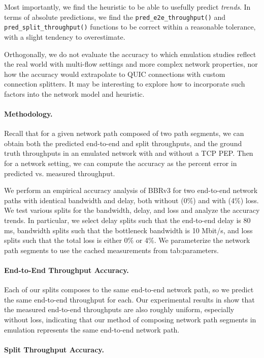 \noindent Most importantly, we find the heuristic to be able to usefully
 predict \textit{trends}.
 In terms of absolute predictions, we find the \texttt{pred\_e2e\_throughput()}
 and \texttt{pred\_split\_throughput()} functions to be correct within a
 reasonable tolerance, with a slight tendency to overestimate.

Orthogonally, we do not evaluate the accuracy to which emulation studies reflect
the real world with multi-flow settings and more complex network properties,
nor how the accuracy would extrapolate to QUIC connections with custom
connection splitters. It may be interesting to explore how to incorporate
such factors into the network model and heuristic.

\paragraph{Methodology.} Recall that for a given network path composed of two
 path segments, we can obtain both the predicted end-to-end and split
 throughputs, and the ground truth throughputs in an emulated network with and
 without a TCP PEP. Then for a network setting, we can compute the accuracy as
 the percent error in predicted vs. measured throughput.

We perform an empirical accuracy analysis of BBRv3 for two end-to-end network paths with
identical bandwidth and delay, both without (0\%) and with (4\%) loss. We test
various splits for the bandwidth, delay, and loss and analyze the accuracy
trends. In particular, we select delay splits such that the end-to-end delay is
80 ms, bandwidth splits such that the bottleneck bandwidth is 10 Mbit/s, and loss
splits such that the total loss is either 0\% or 4\%. We parameterize the network
path segments to use the cached measurements from \Cref
{tab:parameters}.

\paragraph{End-to-End Throughput Accuracy.}

Each of our splits composes to the same end-to-end network path, so we predict
the same end-to-end throughput for each. Our experimental
results in  show that the measured end-to-end
throughputs are also roughly uniform, especially without loss, indicating that
our method of composing network path segments in emulation represents the same
end-to-end network path.

\paragraph{Split Throughput Accuracy.}

